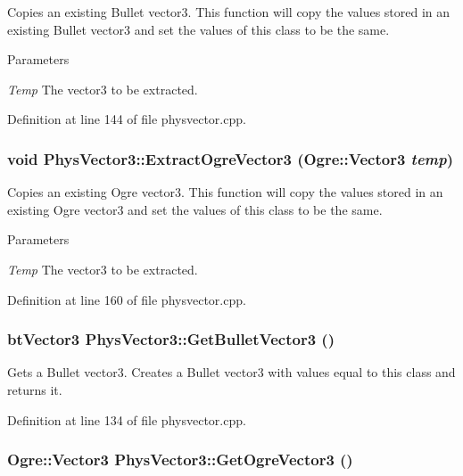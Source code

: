 Copies an existing Bullet vector3. This function will copy the values stored in an existing Bullet vector3 and set the values of this class to be the same. 
\begin{DoxyParams}{Parameters}
\item[{\em Temp}]The vector3 to be extracted. \end{DoxyParams}


Definition at line 144 of file physvector.cpp.\hypertarget{classPhysVector3_a422acbc95f72d00a26cb477ab7db5e87}{
\subsubsection[{ExtractOgreVector3}]{\setlength{\rightskip}{0pt plus 5cm}void PhysVector3::ExtractOgreVector3 (Ogre::Vector3 {\em temp})}}
\label{da/d11/classPhysVector3_a422acbc95f72d00a26cb477ab7db5e87}


Copies an existing Ogre vector3. This function will copy the values stored in an existing Ogre vector3 and set the values of this class to be the same. 
\begin{DoxyParams}{Parameters}
\item[{\em Temp}]The vector3 to be extracted. \end{DoxyParams}


Definition at line 160 of file physvector.cpp.\hypertarget{classPhysVector3_adfc5f9e933a94be994ce5ce0c38d1f96}{
\subsubsection[{GetBulletVector3}]{\setlength{\rightskip}{0pt plus 5cm}btVector3 PhysVector3::GetBulletVector3 ()}}
\label{da/d11/classPhysVector3_adfc5f9e933a94be994ce5ce0c38d1f96}


Gets a Bullet vector3. Creates a Bullet vector3 with values equal to this class and returns it. 

Definition at line 134 of file physvector.cpp.\hypertarget{classPhysVector3_a01facc2b865bb79c589ed1985dd6c49c}{
\subsubsection[{GetOgreVector3}]{\setlength{\rightskip}{0pt plus 5cm}Ogre::Vector3 PhysVector3::GetOgreVector3 ()}}
\label{da/d11/classPhysVector3_a01facc2b865bb79c589ed1985dd6c49c}


